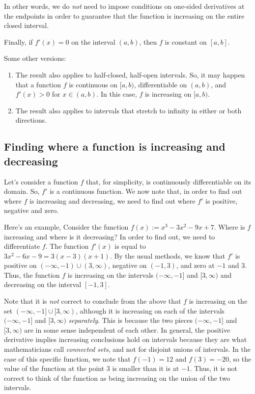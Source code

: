\documentclass{amsart}
\begin{document}
In other words, we do {\em not} need to impose conditions on one-sided
derivatives at the endpoints in order to guarantee that the function
is increasing on the entire closed interval.

Finally, if $f'(x) = 0$ on the interval $(a,b)$, then $f$ is constant
on $[a,b]$.

Some other versions:

\begin{enumerate}
\item The result also applies to half-closed, half-open intervals. So,
  it may happen that a function $f$ is continuous on $[a,b)$,
  differentiable on $(a,b)$, and $f'(x) > 0$ for $x \in (a,b)$. In
  this case, $f$ is increasing on $[a,b)$.
\item The result also applies to intervals that stretch to infinity in
  either or both directions.
\end{enumerate}

\subsection{Finding where a function is increasing and decreasing}

Let's consider a function $f$ that, for simplicity, is continuously
differentiable on its domain. So, $f'$ is a continuous function. We
now note that, in order to find out where $f$ is increasing and
decreasing, we need to find out where $f'$ is positive, negative and
zero.

Here's an example, Consider the function $f(x) := x^3 - 3x^2 - 9x +
7$. Where is $f$ increasing and where is it decreasing? In order to
find out, we need to differentiate $f$. The function $f'(x)$ is equal
to $3x^2 - 6x - 9 = 3(x - 3)(x + 1)$. By the usual methods, we know
that $f'$ is positive on $(-\infty,-1) \cup (3,\infty)$, negative on
$(-1,3)$, and zero at $-1$ and $3$. Thus, the function $f$ is
increasing on the intervals $(-\infty,-1]$ and $[3,\infty)$ and
decreasing on the interval $[-1,3]$.

Note that it is {\em not} correct to conclude from the above that $f$
is increasing on the set $(-\infty,-1] \cup [3,\infty)$, although it
is increasing on each of the intervals $(-\infty,-1]$ and $[3,\infty)$
{\em separately}. This is because the two pieces $(-\infty,-1]$ and
$[3,\infty)$ are in some sense independent of each other. In general,
the positive derivative implies increasing conclusions hold on
intervals because they are what mathematicians call {\em connected
sets}, and not for disjoint unions of intervals. In the case of this
specific function, we note that $f(-1) = 12$ and $f(3) = -20$, so the
value of the function at the point $3$ is smaller than it is at
$-1$. Thus, it is not correct to think of the function as being
increasing on the union of the two intervals.
\end{document}
